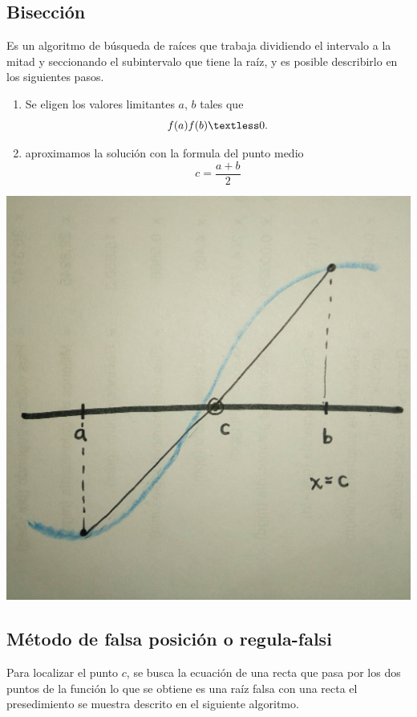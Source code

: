 \subsection{Bisecci\'on}
Es un algoritmo de b\'usqueda de ra\'ices que trabaja dividiendo el intervalo a la mitad y seccionando el subintervalo que tiene la ra\'iz, y es posible describirlo en los siguientes pasos.\\
\begin{center}
\begin{enumerate}
\item Se eligen los valores limitantes $a$,  $b$ tales que 
\begin{displaymath}
f(a)f(b)\textless0.
\end{displaymath}
\item aproximamos la soluci\'on con la formula del punto medio
\begin{displaymath}
c=\frac{a+b}{2}
\end{displaymath}
\end{enumerate}
\end{center}
\begin{center}
\includegraphics[scale=.05]{imagenes/2.jpg}
\end{center}
\subsection{M\'etodo de falsa posici\'on o regula-falsi}
Para localizar el punto $c$, se busca la ecuaci\'on de una recta que pasa por los dos puntos de la funci\'on lo que se obtiene es una ra\'iz falsa con una recta el presedimiento se muestra descrito en el siguiente algoritmo.


